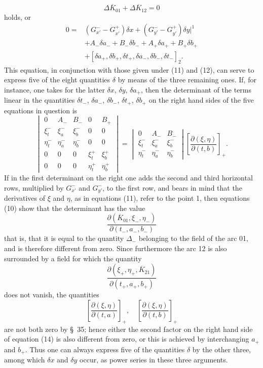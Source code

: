 \documentclass[11pt,a4paper,leqno]{article}
\begin{document}
\[
\Delta\overline K_{01}+\Delta\overline K_{12}=0
\]
holds, or
\begin{equation}\tag{13}
\begin{aligned}
0={}&(G_{x'}^- -G_{x'}^+)\delta x+(G_{y'}^- -G_{y'}^+)\delta y\bigg|^1 \\
&+A_-\delta a_-+B_-\delta b_-+A_+\delta a_+ +B_+\delta b_+ \\
&+[\delta a_+,\delta b_+,\delta t_+,\delta a_-,\delta b_-,\delta t_-]_2.
\end{aligned}
\end{equation}
This equation, in conjunction with those given under (11) and (12), can serve to express five of the eight quantities $\delta$ by means of the three remaining ones. If, for instance, one takes for the latter $\delta x$, $\delta y$, $\delta a_+$, then the determinant of the terms linear in the quantities $\delta t_-$, $\delta a_-$, $\delta b_-$, $\delta t_+$, $\delta b_+$ on the right hand sides of the five equations in question is
\begin{equation}\tag{14}
\begin{vmatrix}
0&A_-&B_-&0&B_+\\
\xi_t^-&\xi_a^-&\xi_b^-&0&0\\
\eta_t^-&\eta_a^-&\eta_b^-&0&0\\
0&0&0&\xi_t^+&\xi_b^+\\
0&0&0&\eta_t^+&\eta_b^+
\end{vmatrix}
=
\begin{vmatrix}
0&A_-&B_-\\
\xi_t^-&\xi_a^-&\xi_b^-\\
\eta_t^-&\eta_a^-&\eta_b^-
\end{vmatrix}
\left[\frac{\partial(\xi,\eta)}{\partial(t,b)}\right]_+ .
\end{equation}
If in the first determinant on the right one adds the second and third horizontal rows, multiplied by $G_{x'}^-$ and $G_{y'}^-$, to the first row, and bears in mind that the derivatives of $\xi$ and $\eta$, as in equations (11), refer to the point 1, then equations (10) show that the determinant has the value
\[
\frac{\partial(\overline K_{01},\xi_-,\eta_-)}{\partial(t_-,a_-,b_-)}
\]
that is, that it is equal to the quantity $\Delta_-$ belonging to the field of the arc 01, and is therefore different from zero. Since furthermore the arc 12 is also surrounded by a field for which the quantity
\[
\frac{\partial(\xi_+,\eta_+,\overline K_{21})}{\partial(t_+,a_+,b_+)}
\]
does not vanish, the quantities
\[
\left[\frac{\partial(\xi,\eta)}{\partial(t,a)}\right]_+,
\quad
\left[\frac{\partial(\xi,\eta)}{\partial(t,b)}\right]_+
\]
are not both zero by \S~35; hence either the second factor on the right hand side of equation (14) is also different from zero, or this is achieved by interchanging $a_+$ and $b_+$. Thus one can always express five of the quantities $\delta$ by the other three, among which $\delta x$ and $\delta y$ occur, as power series in these three arguments.
\end{document}

